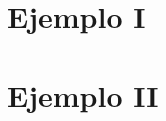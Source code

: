 \documentclass[12pt,a4paper]{book}
\begin{document}

\blankpages


\let\cleardoublepage=\clearpage
\tableofcontents
\thispagestyle{empty}
\blankpages
\geomdoc %


\setcounter{page}{1}
\chapter{Ejemplo I}

\blankpage
\chapter{Ejemplo II}



\blankpages


\nocite{*}
\end{document}
